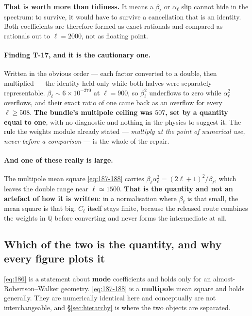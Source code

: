 \textbf{That is worth more than tidiness.} It means a $\beta_\ell$ or
$\alpha_\ell$ slip cannot hide in the spectrum: to survive, it would have to
survive a cancellation that is an identity. Both coefficients are therefore
formed as exact rationals and compared as rationals out to $\ell=2000$, not as
floating point.

\paragraph{Finding T-17, and it is the cautionary one.} Written in the obvious
order --- each factor converted to a double, then multiplied --- the identity
held only while both halves were separately representable.
$\beta_\ell\sim6\times10^{-270}$ at $\ell=900$, so $\beta_\ell^2$ underflows to
zero while $\alpha_\ell^2$ overflows, and their exact ratio of one came back as
an overflow for every $\ell\ge508$. \textbf{The bundle's multipole ceiling was
$507$, set by a quantity equal to one}, with no diagnostic and nothing in the
physics to suggest it. The rule the weights module already stated ---
\emph{multiply at the point of numerical use, never before a comparison} ---
is the whole of the repair.

\paragraph{And one of these really is large.} The multipole mean square
\eqref{eq:187-188} carries $\beta_\ell\alpha_\ell^2=(2\ell+1)^2/\beta_\ell$,
which leaves the double range near $\ell\simeq1500$. \textbf{That is the
quantity and not an artefact of how it is written}: in a normalisation where
$\beta_\ell$ is that small, the mean square is that big. $C_\ell$ itself stays
finite, because the released route combines the weights in $\mathbb Q$ before
converting and never forms the intermediate at all.

\subsection{Which of the two is the quantity, and why every figure plots it}

\eqref{eq:186} is a statement about \textbf{mode} coefficients and holds only
for an almost-Robertson--Walker geometry. \eqref{eq:187-188} is a
\textbf{multipole} mean square and holds generally. They are numerically
identical here and conceptually are not interchangeable, and
\S\ref{sec:hierarchy} is where the two objects are separated.

